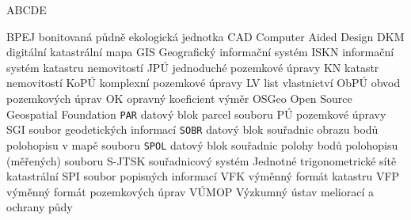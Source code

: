 
\begin{seznamzkratek}{ABCDE}

	      {BPEJ}
	      {bonitovaná půdně ekologická jednotka}
	      {CAD}
	      {Computer Aided Design}
	      {DKM}
	      {digitální katastrální mapa}
	      {GIS}
	      {Geografický informační systém}
	      {ISKN}
	      {informační systém katastru nemovitostí}
	      {JPÚ}
	      {jednoduché pozemkové úpravy}
	      {KN}
	      {katastr nemovitostí}
	      {KoPÚ}
	      {komplexní pozemkové úpravy}
	      {LV}
	      {list vlastnictví}
	      {ObPÚ}
	      {obvod pozemkových úprav}
	      {OK}
	      {opravný koeficient výměr}
	      {OSGeo}
	      {Open Source Geospatial Foundation}
	      {\texttt{PAR}}
	      {datový blok parcel souboru }
	      {PÚ}
	      {pozemkové úpravy}
	      {SGI}
	      {soubor geodetických informací}
	      {\texttt{SOBR}}
	      {datový blok souřadnic obrazu bodů polohopisu v mapě souboru }
	      {\texttt{SPOL}}
	      {datový blok souřadnic polohy bodů polohopisu (měřených) souboru }
	      {S-JTSK}
	      {souřadnicový systém Jednotné trigonometrické sítě katastrální}
	      {SPI}
	      {soubor popisných informací}
	      {VFK}
	      {výměnný formát katastru}
	      {VFP}
	      {výměnný formát pozemkových úprav}
	      {VÚMOP}
	      {Výzkumný ústav meliorací a ochrany půdy}
	      
\end{seznamzkratek}